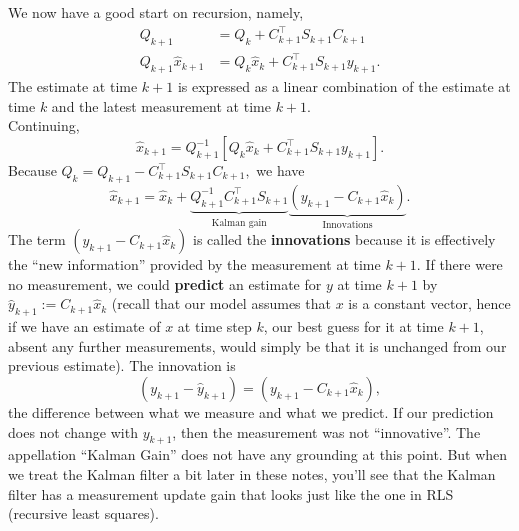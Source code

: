     We now have a good start on recursion, namely,
$$\boxed{
\begin{aligned}
 Q_{k+1} &= Q_k+C_{k+1}^\top S_{k+1}C_{k+1} \\
Q_{k+1}\widehat{x}_{k+1}&=Q_k \widehat{x}_k+C_{k+1}^\top S_{k+1}y_{k+1}.
\end{aligned}
}$$
The estimate at time $k+1$ is expressed as a linear combination of the estimate at time $k$ and the latest measurement at time $k+1$.\\

 Continuing,
    \begin{equation*}
        \widehat{x}_{k+1}=Q_{k+1}^{-1}\left[Q_k\widehat{x}_k+C_{k+1}^\top S_{k+1}y_{k+1}\right].
    \end{equation*}
    Because $ Q_k=Q_{k+1}-C_{k+1}^\top S_{k+1}C_{k+1},$ we have
    \begin{equation*}
        \widehat{x}_{k+1}=\widehat{x}_k+\underbrace{Q_{k+1}^{-1}C_{k+1}^\top S_{k+1}}_{\text{Kalman gain}} \underbrace{(y_{k+1}-C_{k+1}\widehat{x}_k)}_{\text{Innovations}}.
    \end{equation*}
The term $(y_{k+1}-C_{k+1}\widehat{x}_k)$ is called the \textbf{innovations} because it is effectively the ``new information'' provided by the measurement at time $k+1$. If there were no measurement, we could \textbf{predict} an estimate for $y$ at time $k+1$ by $\widehat{y}_{k+1}:= C_{k+1} \widehat{x}_k$ (recall that our model assumes that $x$ is a constant vector, hence if we have an estimate of $x$ at time step $k$, our best guess for it at time $k+1$, absent any further measurements, would simply be that it is unchanged from our previous estimate). The innovation is $$(y_{k+1}-\widehat{y}_{k+1})=(y_{k+1}-C_{k+1}\widehat{x}_k),$$
the difference between what we measure and what we predict. If our prediction does not change with $y_{k+1}$, then the measurement was not ``innovative''. The appellation ``Kalman Gain'' does not have any grounding at this point. But when we treat the Kalman filter a bit later in these notes, you'll see that the Kalman filter has a measurement update gain that looks just like the one in RLS (recursive least squares).\\

